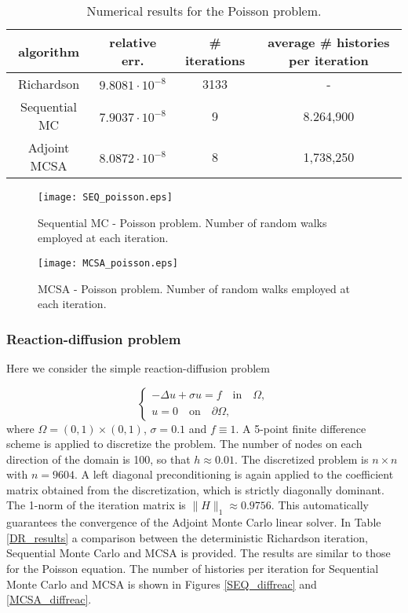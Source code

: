 \documentclass[final,leqno,onefignum,onetabnum]{siamltex1213}
\begin{document}
\begin{table}[!t]
\centering
\hspace*{-0.8cm}
\begin{tabular}{|c|c|c|c|}
\hline
algorithm & relative err.& \# iterations & average \# histories per iteration\\
\hline
Richardson & $9.8081\cdot 10^{-8}$ & 3133 & - \\
\hline
Sequential MC & $7.9037 \cdot 10^{-8}$ & 9 & 8.264,900\\
\hline
 Adjoint MCSA & $8.0872\cdot 10^{-8}$ & 8 & 1,738,250\\
\hline
\end{tabular}
\caption{Numerical results for the Poisson problem.}
\label{Poisson_results}
\end{table}

\begin{figure}
  \centering
    \texttt{[image: SEQ\_poisson.eps]}
\vspace{-0.3in}
    \caption{Sequential MC - Poisson problem. Number of random walks employed
at each iteration.}
\label{SEQ_poisson}
\end{figure}


\begin{figure}
  \centering
    \texttt{[image: MCSA\_poisson.eps]}
\vspace{-0.3in}
      \caption{MCSA - Poisson problem. Number of random walks employed at each
iteration.}
\label{MCSA_poisson}
\end{figure}



\subsubsection{Reaction-diffusion problem}

Here we consider the simple reaction-diffusion problem

\begin{equation}
\begin{cases}
 -\Delta u +\sigma u= f \quad \text{in}\quad \Omega, \\
 u=0\quad \text{on} \quad \partial\Omega,
 \end{cases}
\end{equation}
where $\Omega=(0,1)\times (0,1)$, $\sigma=0.1$ and $f\equiv 1$.
A 5-point finite difference scheme is applied to discretize the problem.
The number of nodes
on each direction of the domain is 100, so that $h\approx 0.01$. The
discretized problem is $n\times n$ with $n=9604$. A left
diagonal preconditioning is again applied to
the coefficient matrix obtained from the discretization, which
is strictly diagonally dominant. The 1-norm of the
iteration matrix is $\lVert H\rVert_1\approx 0.9756$. This automatically
guarantees the convergence of the Adjoint Monte Carlo linear solver. 
In Table \ref{DR_results} a comparison between the deterministic
Richardson iteration, Sequential Monte Carlo and MCSA is provided.
The results are similar to those for the Poisson equation.
The number of histories per iteration for Sequential Monte Carlo and MCSA 
is shown in Figures \ref{SEQ_diffreac} and \ref{MCSA_diffreac}.
\end{document}
